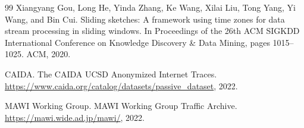 \documentclass[preprint,12pt]{elsarticle}
\begin{document}
\begin{thebibliography}{99}
Xiangyang Gou, Long He, Yinda Zhang, Ke Wang, Xilai Liu, Tong Yang, Yi Wang, and Bin Cui. Sliding sketches: A framework using time zones for data stream processing in sliding windows. In Proceedings of the 26th ACM SIGKDD International Conference on Knowledge Discovery \& Data Mining, pages 1015--1025. ACM, 2020.

CAIDA. The CAIDA UCSD Anonymized Internet Traces. \url{https://www.caida.org/catalog/datasets/passive_dataset}, 2022.

MAWI Working Group. MAWI Working Group Traffic Archive. \url{https://mawi.wide.ad.jp/mawi/}, 2022.

\end{thebibliography}
\endgroup
\end{document}
